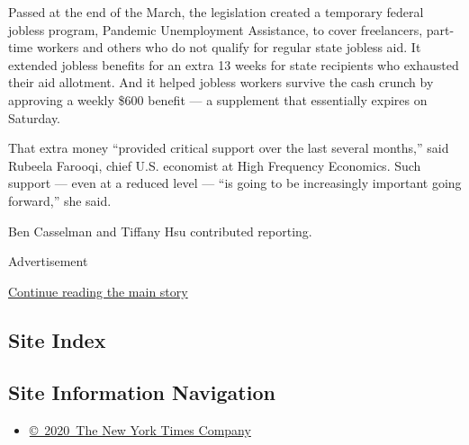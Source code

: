 Passed at the end of the March, the legislation created a temporary
federal jobless program, Pandemic Unemployment Assistance, to cover
freelancers, part-time workers and others who do not qualify for regular
state jobless aid. It extended jobless benefits for an extra 13 weeks
for state recipients who exhausted their aid allotment. And it helped
jobless workers survive the cash crunch by approving a weekly \$600
benefit --- a supplement that essentially expires on Saturday.

That extra money ``provided critical support over the last several
months,'' said Rubeela Farooqi, chief U.S. economist at High Frequency
Economics. Such support --- even at a reduced level --- ``is going to be
increasingly important going forward,'' she said.

Ben Casselman and Tiffany Hsu contributed reporting.

Advertisement

\protect\hyperlink{after-bottom}{Continue reading the main story}

\hypertarget{site-index}{%
\subsection{Site Index}\label{site-index}}

\hypertarget{site-information-navigation}{%
\subsection{Site Information
Navigation}\label{site-information-navigation}}

\begin{itemize}
\tightlist
\item
  \href{https://help.nytimes.com/hc/en-us/articles/115014792127-Copyright-notice}{©~2020~The
  New York Times Company}
\end{itemize}

